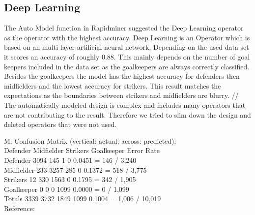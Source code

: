 \subsection{Deep Learning}

The Auto Model function in Rapidminer suggested the Deep Learning operator as the operator with the highest accuracy. Deep Learning is an Operator which is based on an multi layer artificial neural network. Depending on the used data set it scores an accuracy of roughly 0.88. This mainly depends on the number of goal keepers included in the data set as the goalkeepers are always correctly classified. Besides the goalkeepers the model has the highest accuracy for defenders then midfielders and the lowest accuracy for strikers. This result matches the expectations as the boundaries between strikers and midfielders are blurry. //
The automatically modeled design is complex and includes many operators that are not contributing to the result. Therefore we tried to slim down the design and deleted operators that were not used. 


M: Confusion Matrix (vertical: actual; across: predicted):\\
            Defender  Midfielder  Strikers  Goalkeeper   Error              Rate\\
  Defender      3094         145         1           0  0.0451  =    146 / 3,240\\
Midfielder       233        3257       285           0  0.1372  =    518 / 3,775\\
  Strikers        12         330      1563           0  0.1795  =    342 / 1,905\\
Goalkeeper         0           0         0        1099  0.0000  =      0 / 1,099\\
    Totals      3339        3732      1849        1099  0.1004  = 1,006 / 10,019\\
    
Reference:\\
